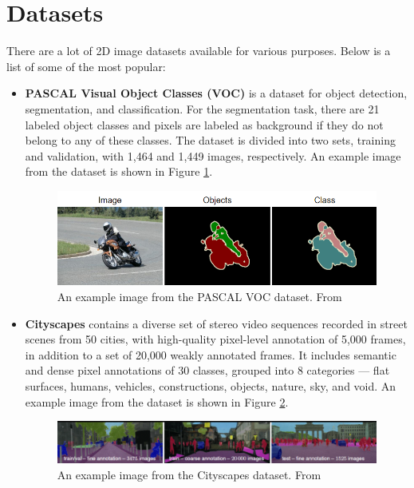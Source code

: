 \section{Datasets}

There are a lot of 2D image datasets available for various purposes. Below is a list of some of the most popular:

\begin{itemize}
    \item \textbf{PASCAL Visual Object Classes (VOC)} is a dataset for object detection, segmentation, and classification. For the segmentation task, there are 21 labeled object classes and pixels are labeled as background if they do not belong to any of these classes. The dataset is divided into two sets, training and validation, with 1,464 and 1,449 images, respectively. An example image from the dataset is shown in Figure \ref{fig:pascal_voc}.
    \begin{figure}[t]
        \centering
         \includegraphics[width=0.8\linewidth]{images/pascal_voc.png}
      
         \caption{An example image from the PASCAL VOC dataset. From \cite{pascal_voc_dataset}}
         \label{fig:pascal_voc}
      \end{figure}
    \item \textbf{Cityscapes} contains a diverse set of stereo video sequences recorded in street scenes from 50 cities, with high-quality pixel-level annotation of 5,000 frames, in addition to a set of 20,000 weakly annotated frames. It includes semantic and dense pixel annotations of 30 classes, grouped into 8 categories — flat surfaces, humans, vehicles, constructions, objects, nature, sky, and void. An example image from the dataset is shown in Figure \ref{fig:cityscapes}.
    \begin{figure}[t]
        \centering
         \includegraphics[width=0.8\linewidth]{images/cityscapes_example.png}
      
         \caption{An example image from the Cityscapes dataset. From \cite{7780719}}
         \label{fig:cityscapes}
      \end{figure}
\end{itemize}